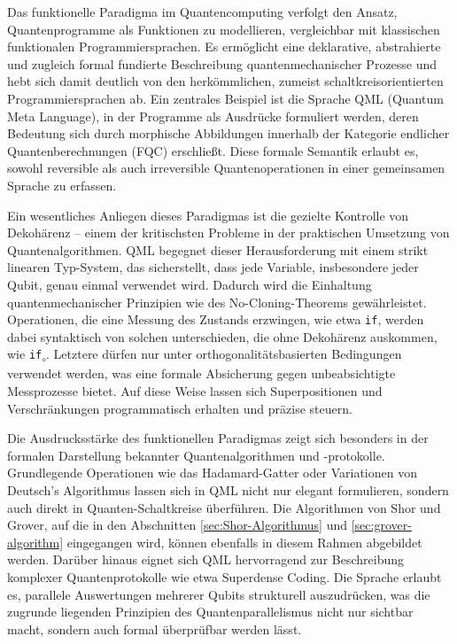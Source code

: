\setlength{\parindent}{0pt} %
\setlength{\parskip}{1em}   %

Das funktionelle Paradigma im Quantencomputing verfolgt den Ansatz, Quantenprogramme als Funktionen zu modellieren, vergleichbar mit klassischen funktionalen Programmiersprachen. Es ermöglicht eine deklarative, abstrahierte und zugleich formal fundierte Beschreibung quantenmechanischer Prozesse und hebt sich damit deutlich von den herkömmlichen, zumeist schaltkreisorientierten Programmiersprachen ab. Ein zentrales Beispiel ist die Sprache QML (Quantum Meta Language), in der Programme als Ausdrücke formuliert werden, deren Bedeutung sich durch morphische Abbildungen innerhalb der Kategorie endlicher Quantenberechnungen (FQC) erschließt. Diese formale Semantik erlaubt es, sowohl reversible als auch irreversible Quantenoperationen in einer gemeinsamen Sprache zu erfassen.

Ein wesentliches Anliegen dieses Paradigmas ist die gezielte Kontrolle von Dekohärenz -- einem der kritischsten Probleme in der praktischen Umsetzung von Quantenalgorithmen. QML begegnet dieser Herausforderung mit einem strikt linearen Typ-System, das sicherstellt, dass jede Variable, insbesondere jeder Qubit, genau einmal verwendet wird. Dadurch wird die Einhaltung quantenmechanischer Prinzipien wie des No-Cloning-Theorems gewährleistet. Operationen, die eine Messung des Zustands erzwingen, wie etwa \texttt{if}, werden dabei syntaktisch von solchen unterschieden, die ohne Dekohärenz auskommen, wie \texttt{if\textsubscript{$\circ$}}. Letztere dürfen nur unter orthogonalitätsbasierten Bedingungen verwendet werden, was eine formale Absicherung gegen unbeabsichtigte Messprozesse bietet. Auf diese Weise lassen sich Superpositionen und Verschränkungen programmatisch erhalten und präzise steuern.

Die Ausdrucksstärke des funktionellen Paradigmas zeigt sich besonders in der formalen Darstellung bekannter Quantenalgorithmen und -protokolle. Grundlegende Operationen wie das Hadamard-Gatter oder Variationen von Deutsch's Algorithmus lassen sich in QML nicht nur elegant formulieren, sondern auch direkt in Quanten-Schaltkreise überführen. Die Algorithmen von Shor und Grover, auf die in den Abschnitten \ref{sec:Shor-Algorithmus} und \ref{sec:grover-algorithm} eingegangen wird, können ebenfalls in diesem Rahmen abgebildet werden. Darüber hinaus eignet sich QML hervorragend zur Beschreibung komplexer Quantenprotokolle wie etwa Superdense Coding. Die Sprache erlaubt es, parallele Auswertungen mehrerer Qubits strukturell auszudrücken, was die zugrunde liegenden Prinzipien des Quantenparallelismus nicht nur sichtbar macht, sondern auch formal überprüfbar werden lässt.

